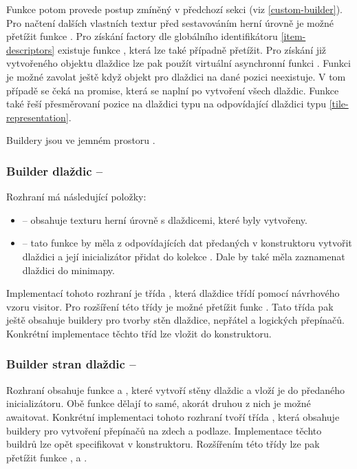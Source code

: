Funkce  potom provede postup zmíněný v předchozí sekci (viz \ref{custom-builder}). Pro načtení dalších vlastních textur 
před sestavováním herní úrovně je možné přetížit funkce . Pro získání factory dle globálního identifikátoru \vref{item-descriptors} 
existuje funkce , která lze také případně přetížit. Pro získání již vytvořeného objektu dlaždice lze pak použít virtuální asynchronní funkci
. Funkci je možné zavolat ještě když objekt pro dlaždici na dané pozici neexistuje. V tom případě se čeká na promise, která se naplní 
po vytvoření všech dlaždic. Funkce také řeší přesměrovaní pozice na dlaždici typu  na odpovídající dlaždici typu  \vref{tile-representation}.

Buildery jsou ve jemném prostoru .


\subsubsection{Builder dlaždic -- }

Rozhraní  má následující položky:
\begin{itemize}
\item {} -- obsahuje texturu herní úrovně s dlaždicemi, které byly vytvořeny. 
\item {} -- tato funkce by měla z odpovídajících dat předaných v konstruktoru vytvořit dlaždici a její inicializátor přidat 
	do kolekce . Dale by také měla zaznamenat dlaždici do minimapy.
\end{itemize}  
Implementací tohoto rozhraní je třída , která dlaždice třídí pomocí návrhového vzoru visitor. Pro rozšíření
	této třídy je možné přetížit funkc . Tato třída pak ještě obsahuje buildery pro tvorby stěn dlaždice, nepřátel a logických přepínačů.
	Konkrétní implementace těchto tříd lze vložit do konstruktoru.


\subsubsection{Builder stran dlaždic -- }

Rozhraní  obsahuje funkce  a , které vytvoří stěny dlaždic
a vloží je do předaného inicializátoru. Obě funkce dělají to samé, akorát druhou z nich je možné awaitovat. Konkrétní implementaci
tohoto rozhraní tvoří třída , která obsahuje buildery pro vytvoření přepínačů na zdech a podlaze. Implementace
těchto buildrů lze opět specifikovat v konstruktoru. Rozšířením této třídy lze pak přetížit funkce , 
 a .


